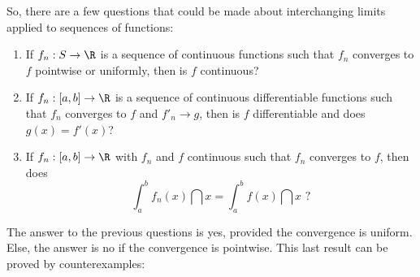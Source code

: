So, there are a few questions that could be made about interchanging limits applied to sequences of functions:
\begin{enumerate}
    \item If $f_n: S \to \R$ is a sequence of continuous functions such that $f_n$ converges to $f$ pointwise or uniformly, then is $f$ continuous?
    \item If $f_n: [a,b] \to \R$ is a sequence of continuous differentiable functions such that $f_n$ converges to $f$ and $f'_n \to g$, then is $f$ differentiable and does $g(x) = f'(x)$?
    \item If $f_n: [a,b] \to \R$ with $f_n$ and $f$ continuous such that $f_n$ converges to $f$, then does
        \begin{equation*}
            \int_a^b f_n(x) \dint x = \int_a^b f(x) \dint x \text{ ?}
        \end{equation*}
\end{enumerate}

The answer to the previous questions is yes, provided the convergence is uniform. Else, the answer is no if the convergence is pointwise. This last result can be proved by counterexamples:

